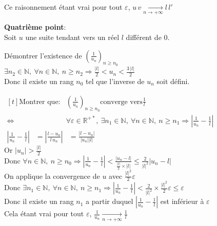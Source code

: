 \documentclass[12pt,twoside,a4paper]{article}
\begin{document}
\begin{preuve}
\begin{liste}
					Ce raisonnement \'etant vrai pour tout $\varepsilon$, $u\,v\mathop{\longrightarrow}\limits_{n\rightarrow+\infty}l\,l'$
				\item\textbf{Quatri\`eme point}:\\
					Soit $u$ une suite tendant vers un r\'eel $l$ diff\'erent de 0.\\
					\begin{liste}
						\item D\'emontrer l'existence de $\left(\frac{1}{u_n}\right)_{n\geqslant n_0}$\\
							$\exists n_2\in\mathbb{N},\ \forall n\in\mathbb{N},\ n\geqslant n_2\Rightarrow \frac{|l|}{2}<u_n<\frac{3\,|l|}{2}$\\
							Donc il existe un rang $n_0$ tel que l'inverse de $u_n$ soit d\'efini.
						\item $\begin{aligned}[t]\text{Montrer que:}&\left(\frac{1}{u_n}\right)_{n\geqslant n_0}\text{converge vers}\frac{1}{l}\\
								\iff&\forall\varepsilon\in\mathbb{R}^{+*},\ \exists n_1\in\mathbb{N},\ \forall n\in\mathbb{N},\ n\geqslant n_1\Rightarrow\left|\frac{1}{u_n}-\frac{1}{l}\right|\end{aligned}$
							$\begin{aligned}\left|\frac{1}{u_n}-\frac{1}{l}\right|&=\left|\frac{l-u_n}{l\,u_n}\right|
								&=\frac{\left| l-u_n\right|}{\left| u_n\right| \left| l\right| }\end{aligned}$\\
							Or $\left| u_n\right| >\frac{\left| l\right| }{2}$\\
							Donc $\forall n\in\mathbb{N},\ n\geqslant n_0\Rightarrow\left|\frac{1}{u_n}-\frac{1}{l}\right|<\frac{\left| u_n-l\right| }{\frac{\left| l\right| }{2}\times\left| l\right| }\leqslant \frac{2}{\left| l\right| ^2}\left| u_n-l\right|$\\
							On applique la convergence de $u$ avec $\frac{\left| l\right| ^2}{2}\varepsilon$\\
							Donc $\exists n_1\in\mathbb{N},\ \forall n\in\mathbb{N},\ n\geqslant n_1\Rightarrow\left|\frac{1}{u_n}-\frac{1}{l}\right|< \frac{2}{\left| l\right| ^2}\times\frac{\left| l\right| ^2}{2}\varepsilon \leqslant \varepsilon$\\
							Donc il existe un rang $n_1$ a partir duquel $\left|\frac{1}{u_n}-\frac{1}{l}\right|$ est inf\'erieur \`a $\varepsilon$\\
							Cela \'etant vrai pour tout $\varepsilon$, $\frac{1}{u_n}\mathop{\longrightarrow}\limits_{n\rightarrow+\infty}\frac{1}{l}$
					\end{liste}
			\end{liste}
		\end{preuve}
\end{document}
